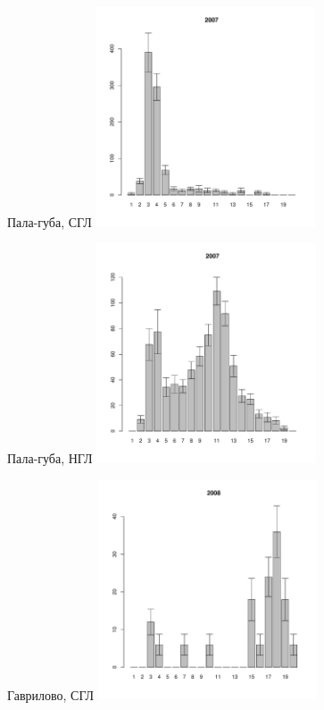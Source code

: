 \begin{figure}[hp]
\begin{minipage}[b]{.46\linewidth}
	\begin{center}
	{\tiny Пала-губа, СГЛ}
	\includegraphics[width=65mm]{../Barenc_Sea/Pala/middle_2007_.pdf}
	\end{center}
	\end{minipage}
	\hfil %
	\begin{minipage}[b]{.46\linewidth}
	\begin{center}	
	{\tiny Пала-губа, НГЛ}
	\includegraphics[width=65mm]{../Barenc_Sea/Pala/low_2007_.pdf}
	\end{center}
	\end{minipage}
	\begin{minipage}[b]{.46\linewidth}
	\begin{center}
	{\tiny Гаврилово, СГЛ}
	\includegraphics[width=65mm]{../Barenc_Sea/Gavrilovo/middle_2008_.pdf}

\end{center}
\end{minipage}
\end{figure}
